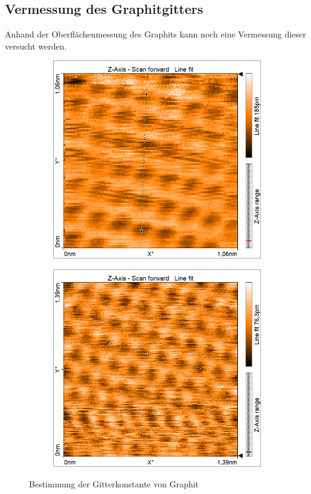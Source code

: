 \subsection{Vermessung des Graphitgitters}
Anhand der Oberflächenmessung des Graphits kann noch eine Vermessung dieser
versucht werden.
\begin{figure}[h]
    \begin{subfigure}[c]{0.45\textwidth}
        \includegraphics[width=\textwidth]{Mess/graphit_gitterkonst.png}
    \end{subfigure}
    \begin{subfigure}[c]{0.45\textwidth}
        \includegraphics[width=\textwidth]{Mess/graphit_gitterkonst2.png}
    \end{subfigure}
    \caption{Bestimmung der Gitterkonstante von Graphit}
    \label{graphgit}
\end{figure}
